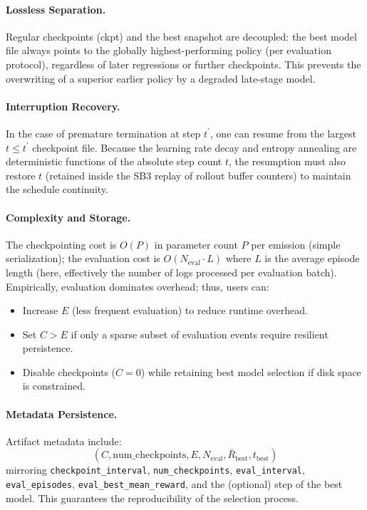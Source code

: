 \paragraph{Lossless Separation.}
Regular checkpoints (ckpt) and the best snapshot are decoupled: the best model file always points to the globally highest-performing policy (per evaluation protocol), regardless of later regressions or further checkpoints. This prevents the overwriting of a superior earlier policy by a degraded late-stage model.

\paragraph{Interruption Recovery.}
In the case of premature termination at step $t^\prime$, one can resume from the largest $t \le t^\prime$ checkpoint file. Because the learning rate decay and entropy annealing are deterministic functions of the absolute step count $t$, the resumption must also restore $t$ (retained inside the SB3 replay of rollout buffer counters) to maintain the schedule continuity.

\paragraph{Complexity and Storage.}
The checkpointing cost is $O(P)$ in parameter count $P$ per emission (simple serialization); the evaluation cost is $O(N_{\text{eval}}\cdot L)$ where $L$ is the average episode length (here, effectively the number of logs processed per evaluation batch). Empirically, evaluation dominates overhead; thus, users can:
\begin{itemize}
  \item Increase $E$ (less frequent evaluation) to reduce runtime overhead.
  \item Set $C > E$ if only a sparse subset of evaluation events require resilient persistence.
  \item Disable checkpoints ($C=0$) while retaining best model selection if disk space is constrained.
\end{itemize}

\paragraph{Metadata Persistence.}
Artifact metadata include:
\[
(C, \text{num\_checkpoints}, E, N_{\text{eval}}, \bar{R}_{\text{best}}, t_{\text{best}})
\]
mirroring \texttt{checkpoint\_interval}, \texttt{num\_checkpoints}, \texttt{eval\_interval}, \texttt{eval\_episodes}, \texttt{eval\_best\_mean\_reward}, and the (optional) step of the best model. This guarantees the reproducibility of the selection process.

